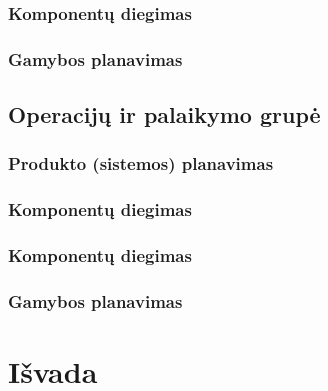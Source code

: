 \documentclass{VUMIFPSkursinis}
\begin{document}
			\subsubsection{Komponentų diegimas}
			\subsubsection{Gamybos planavimas}
		\subsection{Operacijų ir palaikymo grupė}
			\subsubsection{Produkto (sistemos) planavimas}
			\subsubsection{Komponentų diegimas}
			\subsubsection{Komponentų diegimas}
			\subsubsection{Gamybos planavimas}

	\section{Išvada}
\end{document}
